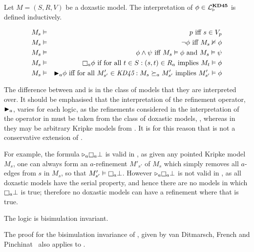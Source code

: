 \begin{definition}
Let $M = (S, R, V)$ be a doxastic model. The interpretation of $\phi \in
\mathcal{L}^{\mathbf{KD45}}_{\mathopen{\triangleright}}$ is defined inductively.

\begin{eqnarray*}
M_s &\entails& p \text{ iff } s \in V_p\\
M_s &\entails& \neg \phi \text{ iff } M_s \nentails \phi\\
M_s &\entails& \phi \land \psi \text{ iff } M_s \entails \phi \text{ and } M_s
\entails \psi\\
M_s &\entails& \knows_a \phi \text{ if for all } t \in S : (s, t) \in R_a \text{
implies } M_t \entails \phi\\
M_s &\entails& \allrefs_a \phi \text{ iff for all } M'_{s'} \in \classKD : M_s
\simulation_a M'_{s'} \text{ implies } M'_{s'} \entails \phi\\
\end{eqnarray*}
\end{definition}

The difference between \logicKF{} and \logicKDF{} is in the class of models that
they are interpreted over. It should be emphasised that the interpretation of
the refinement operator, ${\mathopen{\blacktriangleright}}_a$, varies for each logic, as the refinements
considered in the interpretation of the operator in \logicKDF{} must be taken
from the class of doxastic models, \classKD{}, whereas in \logicKF{} they may be
arbitrary Kripke models from \classK{}. It is for this reason that \logicKDF{}
is not a conservative extension of \logicKF{}. 

For example, the formula $\somerefs_a \knows_a \bot$ is valid in \logicKF{}, as
given any pointed Kripke model $M_s$, one can always form an $a$-refinement
$M'_{s'}$ of $M_s$ which simply removes all $a$-edges from $s$ in $M_s$, so that
$M'_{s'} \entails \knows_a \bot$. However $\somerefs_a \knows_a \bot$ is not
valid in \logicKDF{}, as all doxastic models have the serial property, and
hence there are no models in which $\knows_a \bot$ is true; therefore no
doxastic models can have a refinement where that is true.

\begin{lemma}
The logic \logicKDF{} is bisimulation invariant.
\end{lemma}

The proof for the bisimulation invariance of \logicKF{}, given by van Ditmarsch,
French and Pinchinat~\cite{french2010future} also applies to \logicKDF{}. 


